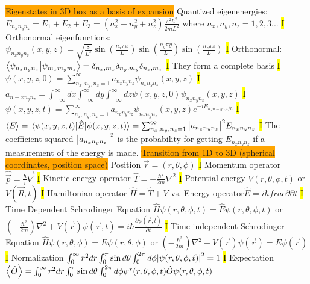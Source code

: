 \documentclass[fontsize=4pt]{scrartcl}
\begin{document}
\colorbox{Orange}{Eigenstates in 3D box as a basis of expansion}
Quantized eigenenergies: $E_{n_x n_y n_z} = E_1 + E_2 + E_3 = (n_x^2 + n_y^2 + n_z^2)\frac{\pi^2 \hbar^2}{2mL^2}$ where $n_x, n_y, n_z = 1,2,3...$
\hl{I}
Orthonormal eigenfunctions: $\psi_{n_x n_y n_z}(x,y,z) = \sqrt{\frac{8}{L^3}} \sin(\frac{n_x \pi x}{L}) \sin(\frac{n_y \pi y}{L}) \sin(\frac{n_z \pi z}{L})$ 
\hl{I}
Orthonormal: $\braket{\psi_{n_x n_y n_z}}{\psi_{m_x m_y m_z}}  = \delta_{n_x , m_x}\delta_{n_y , m_y}\delta_{n_z , m_z}$
\hl{I}
They form a complete basis 
\hl{I}
$\psi(x,y,z,0) = \sum_{n_x ,n_y, n_z = 1}^{\infty} a_{n_x n_y n_z} \psi_{n_x n_y n_z}(x,y,z)$
\hl{I}
$a_{n+x n_y n_z} = \int_{-\infty}^{\infty} dx \int_{-\infty}^{\infty} dy \int_{-\infty}^{\infty} dz \psi(x,y,z,0) \psi_{n_x n_y n_z}(x,y,z)$
\hl{I}
$\psi (x,y,z,t) = \sum_{n_x ,n_y, n_z = 1}^{\infty} a_{n_x n_y n_z} \psi_{n_x n_y n_z}(x,y,z)e^{-iE_{n_x n-y n_z t / \hbar}}$
\hl{I}
$\expval{E} = \expval{\hat{E}}{\psi(x,y,z,t)} = \sum_{n_x ,n_y, n_z = 1}^{\infty} \abs{ a_{n_x n_y n_z}}^2 E_{n_x n_y n_z} $
\hl{I}
The coefficient squared $ \abs{ a_{n_x n_y n_z}}^2$ is the probability for getting $E_{n_x n_y n_z}$ if a measurement of the energy is made.
\colorbox{Orange}{Transition from 1D to 3D (spherical coordinates, position space)}
Position $\vec{r} = (r,\theta,\phi)$
\hl{I}
Momentum operator $\hat{\vec{p}} = \frac{\hbar}{i}\vec{\nabla}$
\hl{I}
Kinetic energy operator $\hat{T} = -\frac{\hbar^2}{2m}\nabla^2$
\hl{I}
Potential energy $V(r,\theta,\phi,t)$ or $V(\vec{R},t)$
\hl{I}
Hamiltonian operator $\hat{H} = \hat{T} + V$ vs. Energy operator$ \hat{E} = i\hbar frac{\partial}{\partial t}$
\hl{I}
Time Dependent Schrodinger Equation $\hat{H}\psi(r,\theta,\phi,t) = \hat{E}\psi(r,\theta,\phi,t)$ or $(-\frac{\hbar^2}{2m})\nabla^2 + V(\vec{r})\psi(\vec{r},t) = i\hbar \frac{\partial \psi(\vec{r}, t)}{\partial t}$
\hl{I}
Time independent Schrodinger Equation $\hat{H}\psi(r,\theta,\phi) = E\psi(r,\theta,\phi)$ or $(-\frac{\hbar^2}{2m})\nabla^2 + V(\vec{r})\psi(\vec{r}) = E \psi(\vec{r})$
\hl{I}
Normalization $\int_{0}^{\infty} r^2 dr \int_{0}^{\pi} \sin d\theta \int_{0}^{2\pi} d\phi \abs{\psi(r,\theta,\phi,t)}^2 = 1$ 
\hl{I}
Expectation $\expval{\hat{O}} = \int_{0}^{\infty} r^2 dr \int_{0}^{\pi} \sin d\theta \int_{0}^{2\pi} d\phi \psi^*(r,\theta,\phi, t) \hat{O}\psi(r,\theta,\phi, t) $
\end{document}
